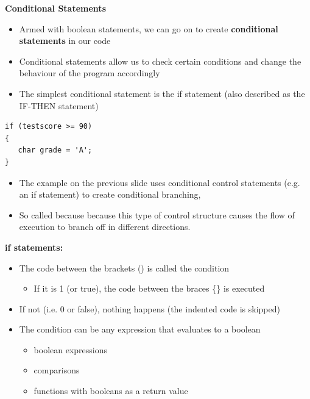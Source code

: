 \documentclass{beamer}
\begin{document}
\begin{frame}[fragile]
 
\textbf{Conditional Statements}
 
\begin{itemize}
\item Armed with boolean statements, we can go on to create \textbf{conditional statements} in our code
\item Conditional statements allow us to check certain conditions and change the behaviour of the program accordingly
\item The simplest conditional statement is the if statement (also described as the IF-THEN statement)
\end{itemize}

\begin{block}{}
\begin{lstlisting}
if (testscore >= 90) 
{
   char grade = 'A';
}
\end{lstlisting}
\end{block}
\end{frame}


\begin{frame}
\begin{itemize}
\item The example on the previous slide uses conditional control statements (e.g. an if statement) to create conditional branching, 
\item So called because because this type of control structure causes the flow of execution to branch off in different
directions.
\end{itemize}
\end{frame}

\begin{frame}
\textbf{if statements:}
\begin{itemize}
\item The code between the brackets () is called the condition 
\begin{itemize}
\item If it is 1 (or true), the code between the braces \{\} is executed
\end{itemize}
\item If not (i.e. 0 or false), nothing happens (the indented code is skipped)
\item The condition can be any expression that evaluates to a boolean

\begin{itemize}
\item boolean expressions
\item comparisons
\item functions with booleans as a return value 
\end{itemize}
\end{itemize}
\end{frame}
\end{document}
